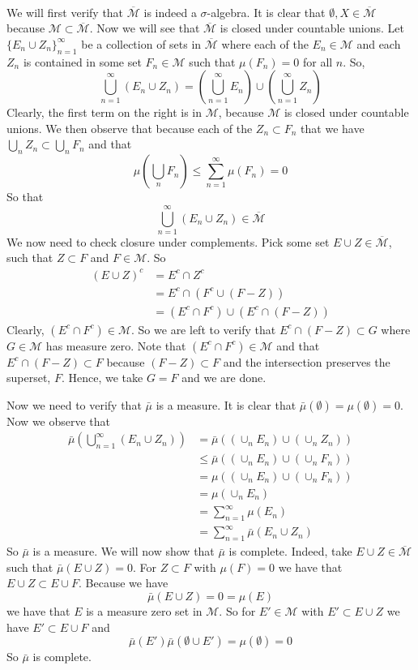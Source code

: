 \documentclass{article}
\newcommand{\problem}[1]{\noindent{\textbf{Problem #1}}\\}
\newcommand{\problempart}[1]{\noindent{\textbf{(#1)}}}
\begin{document}
\problem{6.7.2}
\problempart{a} We will first verify that $\overline{\mathcal{M}}$ is indeed a $\sigma$-algebra. It is clear that $\emptyset, X \in \overline{\mathcal{M}}$ because $\mathcal{M} \subset \overline{\mathcal{M}}$. Now we will see that $\overline{\mathcal{M}}$ is closed under countable unions. Let $\{E_n \cup Z_n\}_{n=1}^\infty$ be a collection of sets in $\overline{\mathcal{M}}$ where each of the $E_n \in \mathcal{M}$ and each $Z_n$ is contained in some set $F_n \in \mathcal{M}$ such that $\mu(F_n) = 0$ for all $n$. So,
\[
\bigcup_{n=1}^\infty (E_n \cup Z_n) = \left(\bigcup_{n=1}^\infty E_n\right) \cup \left(\bigcup_{n=1}^\infty Z_n\right) 
\] 
Clearly, the first term on the right is in $\mathcal{M}$, because $\mathcal{M}$ is closed under countable unions. We then observe that because each of the $Z_n \subset F_n$ that we have $\bigcup_n Z_n \subset \bigcup_n F_n$ and that
\[
\mu\left(\bigcup_n F_n\right) \leq \sum_{n=1}^\infty \mu(F_n) = 0
\] 
So that 
\[
\bigcup_{n=1}^\infty (E_n \cup Z_n) \in \overline{\mathcal{M}}
\]
We now need to check closure under complements. Pick some set $E \cup Z \in \overline{\mathcal{M}}$, such that $Z \subset F$ and $F \in \mathcal{M}$. So
\begin{align*}
(E \cup Z)^c &= E^c \cap Z^c \\
&= E^c \cap (F^c \cup (F - Z)) \\
&= (E^c \cap F^c) \cup (E^c \cap (F-Z))
\end{align*}
Clearly, $(E^c \cap F^c) \in \mathcal{M}$. So we are left to verify that $E^c \cap (F - Z) \subset G$ where $G \in \mathcal{M}$ has measure zero. Note that $(E^c \cap F^c) \in \mathcal{M}$ and that $E^c \cap (F-Z) \subset F$ because $(F-Z) \subset F$ and the intersection preserves the superset, $F$. Hence, we take $G = F$ and we are done. 

  
\problempart{b} Now we need to verify that $\bar{\mu}$ is a measure. It is clear that $\bar{\mu}(\emptyset) = \mu(\emptyset) = 0$. Now we observe that
\begin{align*}
\bar{\mu}\left(\bigcup_{n=1}^\infty (E_n \cup Z_n)\right) &= \bar{\mu} \left((\cup_n E_n) \cup (\cup_n Z_n)\right) \\ 
&\leq \bar{\mu} \left((\cup_n E_n) \cup (\cup_n F_n)\right) \\
&= \mu\left((\cup_n E_n) \cup (\cup_n F_n)\right) \\
&= \mu(\cup_n E_n) \\
&= \sum_{n=1}^\infty \mu(E_n) \\
&= \sum_{n=1}^\infty \bar{\mu}(E_n \cup Z_n)
\end{align*}
So $\bar{\mu}$ is a measure. We will now show that $\bar{\mu}$ is complete. Indeed, take $E \cup Z \in \overline{\mathcal{M}}$ such that $\bar{\mu}(E \cup Z) = 0$. For $Z \subset F$ with $\mu(F) = 0$ we have that $E \cup Z \subset E \cup F$. Because we have
\[
\bar{\mu}(E \cup Z) = 0 = \mu(E)
\]
we have that $E$ is a measure zero set in $\mathcal{M}$. So for $E' \in \mathcal{M}$ with $E' \subset E \cup Z$ we have  $E' \subset E\cup F$ and
\[
\bar{\mu}(E') \bar{\mu}(\emptyset \cup E') = \mu(\emptyset) = 0
\]
So $\bar{\mu}$ is complete. 
\end{document}
